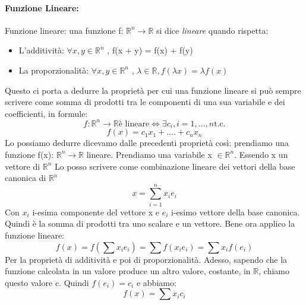 \paragraph{Funzione Lineare:}
Funzione lineare: una funzione f: $\mathbb{R}^n \to \mathbb{R}$ si dice \textit{lineare} quando rispetta:
\begin{itemize}
    \item L'additività: $\forall x, y \in \mathbb{R}^n$ , f(x + y) = f(x) + f(y)
    \item La proporzionalità: $\forall x, y \in \mathbb{R}^n$ , $\lambda \in \mathbb{R}, f(\lambda x) = \lambda f(x)$
\end{itemize}
Questo ci porta a dedurre la proprietà per cui una funzione lineare si può sempre scrivere come somma di prodotti tra le componenti di una sua variabile e dei coefficienti, in formule:
\begin{equation*}
    f: \mathbb{R}^n \to \mathbb{R} \text{è lineare} \Longleftrightarrow \exists c_i, i = 1,..., n \text{t.c.} 
\end{equation*}
\begin{equation*}
    f(x) = c_1x_1 + .... + c_nx_n
\end{equation*}
Lo possiamo dedurre dicevamo dalle precedenti proprietà così: prendiamo una funzione f(x): $\mathbb{R}^n \to \mathbb{R}$ lineare. Prendiamo una variabile x $\in \mathbb{R}^n$. Essendo x un vettore di $\mathbb{R}^n$ Lo posso scrivere come combinazione lineare dei vettori della base canonica di $\mathbb{R}^n$
\begin{equation*}
    x = \sum_{i=1}^n x_ie_i
\end{equation*}
Con $x_i$ i-esima componente del vettore x e $e_i$ i-esimo vettore della base canonica. Quindi è la somma di prodotti tra uno scalare e un vettore. Bene ora applico la funzione lineare:
\begin{equation*}
    f(x) = f(\sum x_i e_i) = \sum f(x_i e_i) = \sum x_if(e_i)
\end{equation*}
Per la proprietà di additività e poi di proporzionalità. Adesso, sapendo che la funzione calcolata in un valore produce un altro valore, costante, in $\mathbb{R}$, chiamo questo valore c. Quindi $f(e_i) = c_i$ e abbiamo:
\begin{equation*}
    f(x) = \sum x_ic_i
\end{equation*}





